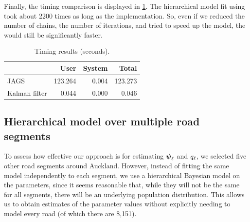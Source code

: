 Finally, the timing comparison is displayed in \cref{tab:nw_model_n1_timecomp}. The hierarchical model fit using  took about 2200 times as long as the \kf{} implementation. So, even if we reduced the number of chains, the number of iterations, and tried to speed up the  model, the \kf{} would still be significantly faster.


\begin{table}

\caption{\label{tab:nw_model_n1_timecomp}Timing results (seconds).}
\centering
\begin{tabular}[b]{lrrr}
\toprule
  & User & System & Total\\
\midrule
JAGS & 123.264 & 0.004 & 123.273\\
Kalman filter & 0.044 & 0.000 & 0.046\\
\bottomrule
\end{tabular}
\end{table}




\subsection{Hierarchical model over multiple road segments}
\label{sec:nw_par_est_multiple}



To assess how effective our approach is for estimating $\mathbf{\boldsymbol{\psi}}_\ell$ and $q_\ell$, we selected five other road segments around Auckland. However, instead of fitting the same model independently to each segment,  we use a hierarchical Bayesian model on the parameters, since it seems reasonable that, while they will not be the same for all segments, there will be an underlying population distribution. This allows us to obtain estimates of the parameter values without explicitly needing to model every road (of which there are 8,151).


